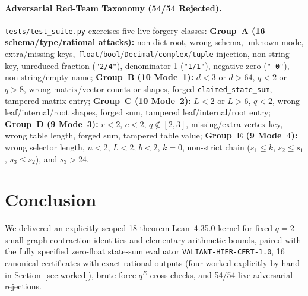 \documentclass[10pt,twocolumn]{article}
\newcommand{\certschema}{\texttt{VALIANT-HIER-CERT-1.0}}
\begin{document}
\paragraph{Adversarial Red-Team Taxonomy (54/54 Rejected).}
\nolinkurl{tests/test_suite.py} exercises five live forgery classes: \textbf{Group~A (16 schema/type/rational attacks):} non-dict root, wrong schema, unknown mode, extra/missing keys, \texttt{float}/\texttt{bool}/\texttt{Decimal}/\texttt{complex}/\texttt{tuple} injection, non-string key, unreduced fraction (\texttt{"2/4"}), denominator-1 (\texttt{"1/1"}), negative zero (\texttt{"-0"}), non-string/empty name; \textbf{Group~B (10 Mode~1):} $d<3$ or $d>64$, $q<2$ or $q>8$, wrong matrix/vector counts or shapes, forged \texttt{claimed\_state\_sum}, tampered matrix entry; \textbf{Group~C (10 Mode~2):} $L<2$ or $L>6$, $q<2$, wrong leaf/internal/root shapes, forged sum, tampered leaf/internal/root entry; \textbf{Group~D (9 Mode~3):} $r<2$, $c<2$, $q\notin[2,3]$, missing/extra vertex key, wrong table length, forged sum, tampered table value; \textbf{Group~E (9 Mode~4):} wrong selector length, $n<2$, $L<2$, $b<2$, $k=0$, non-strict chain ($s_1\le k$, $s_2\le s_1$, $s_3\le s_2$), and $s_3>24$.

\section{Conclusion}\label{sec:outlook}
We delivered an explicitly scoped 18-theorem Lean~4.35.0 kernel for fixed $q=2$ small-graph contraction identities and elementary arithmetic bounds, paired with the fully specified zero-float state-sum evaluator \certschema{}, 16 canonical certificates with exact rational outputs (four worked explicitly by hand in Section~\ref{sec:worked}), brute-force $q^E$ cross-checks, and 54/54 live adversarial rejections.



\end{document}
